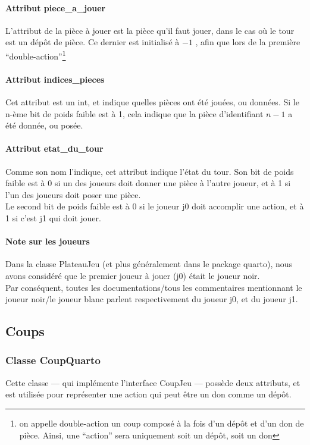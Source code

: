 \documentclass{article}
\begin{document}
\paragraph{Attribut piece\_a\_jouer}
L'attribut de la pièce à jouer est la pièce qu'il faut jouer, dans le
cas o\`u le tour est un dépôt de pièce. Ce dernier est initialisé à
\(-1\) , afin que lors de la première ``double-action''\footnote{ on
  appelle double-action un coup composé à la fois d'un dépôt et d'un
  don de pièce. Ainsi, une ``action'' sera uniquement soit un dépôt,
  soit un don}

\paragraph{Attribut indices\_pieces}
Cet attribut est un int, et indique quelles pièces ont été jouées, ou données.
Si le n-ème bit de poids faible est à 1, cela indique que la pièce
d'identifiant \(n-1\) a été donnée, ou posée.

\paragraph{Attribut etat\_du\_tour}
Comme son nom l'indique, cet attribut indique l'état du tour.
Son bit de poids faible est à 0 si un des joueurs doit donner une
pièce à l'autre joueur, et à 1 si l'un des joueurs doit poser une
pièce.\\
Le second bit de poids faible est à 0 si le joueur j0 doit accomplir
une action, et à 1 si c'est j1 qui doit jouer.


\paragraph{Note sur les joueurs}
Dans la classe PlateauJeu (et plus généralement dans le package
quarto), nous avons considéré que le premier joueur à jouer (j0) était
le joueur noir. \\
Par conséquent, toutes les documentations/tous les
commentaires mentionnant le joueur noir/le joueur blanc parlent
respectivement du joueur j0, et du joueur j1.

\subsection{Coups}
\subsubsection{Classe CoupQuarto}
Cette classe --- qui implémente l'interface CoupJeu ---
possède deux attributs, et est utilisée pour représenter
une action qui peut être un don comme un dépôt.
\end{document}
